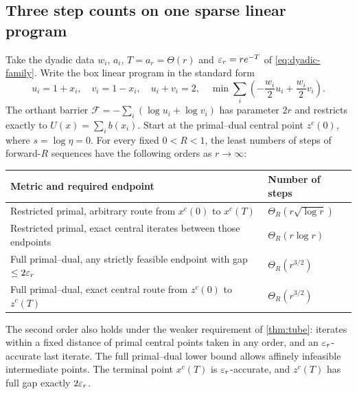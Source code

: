 \subsection{Three step counts on one sparse linear program}
\begin{theorem}
\label{thm:completion}
Take the dyadic data $w_i$, $a_i$, $T=a_r=\Theta(r)$ and
$\varepsilon_r=re^{-T}$ of \eqref{eq:dyadic-family}. Write the box linear program in
the standard form
\begin{equation}
 u_i=1+x_i,\quad v_i=1-x_i,\quad u_i+v_i=2,\quad
 \min\sum_i\left(-\frac{w_i}2u_i+\frac{w_i}2v_i\right).
 \label{eq:box-standard-form}
\end{equation}
The orthant barrier $\mathcal F=-\sum_i(\log u_i+\log v_i)$ has
parameter $2r$ and restricts exactly to $U(x)=\sum_i b(x_i)$.
Start at the primal--dual central point $z^c(0)$, where
$s=\log\eta=0$. For every fixed $0<R<1$, the least numbers of steps of
forward-$R$ sequences have the following orders as $r\to\infty$:
\begin{center}
\begin{tabular}{@{}p{}l@{}}
\toprule
Metric and required endpoint & Number of steps\\
\midrule
Restricted primal, arbitrary route from $x^c(0)$ to $x^c(T)$
 & $\Theta_R(r\sqrt{\log r})$\\
Restricted primal, exact central iterates between those endpoints
 & $\Theta_R(r\log r)$\\
Full primal--dual, any strictly feasible endpoint with gap $\leq2\varepsilon_r$
 & $\Theta_R(r^{3/2})$\\
Full primal--dual, exact central route from $z^c(0)$ to $z^c(T)$
 & $\Theta_R(r^{3/2})$\\
\bottomrule
\end{tabular}
\end{center}
The second order also holds under the weaker requirement of
\cref{thm:tube}: iterates within a fixed distance of primal central
points taken in any order, and an $\varepsilon_r$-accurate last iterate. The full
primal--dual lower bound allows affinely infeasible intermediate points. The terminal point $x^c(T)$ is $\varepsilon_r$-accurate,
and $z^c(T)$ has full gap exactly $2\varepsilon_r$.
\end{theorem}
